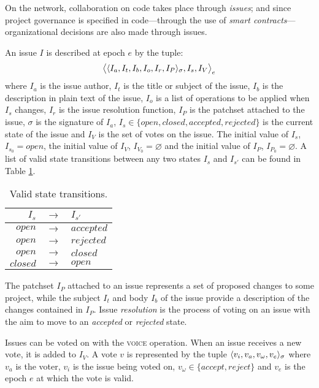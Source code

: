 On the \oscoin{} network, collaboration on code takes place through \emph{issues};
and since project governance is specified in code---through the use of
\emph{smart contracts}---organizational decisions are also made through issues.


An issue $I$ is described at epoch $e$ by the tuple:
\[
    \big<\langle I_a, I_t, I_b, I_o, I_r, I_P \rangle_{\sigma}, I_s, I_V \big>_e
\]
where $I_a$ is the issue author, $I_t$ is the title or subject of the issue,
$I_b$ is the description in plain text of the issue, $I_o$ is a list of
operations to be applied when $I_s$ changes, $I_r$ is the issue resolution
function, $I_P$ is the patchset attached to the issue, $\sigma$ is the
signature of $I_a$, $I_s \in \{open, closed, accepted, rejected\}$ is the
current state of the issue and $I_V$ is the set of votes on the issue. The
initial value of $I_s$, $I_{s_0} = open$, the initial value of $I_V$, $I_{V_0}
= \varnothing$ and the initial value of $I_P$, $I_{P_0} = \varnothing$.  A list
of valid state transitions between any two states $I_s$ and $I_{s'}$ can be
found in Table \ref{issues-valid-transitions}.

\begin{table}[hbt]
    \caption{Valid state transitions.\label{issues-valid-transitions}}
    \begin{tabular}{rcl}
        \toprule
        $I_s$      & $\to$ & $I_{s'}$ \\
        \midrule
        $open$     & $\to$ & $accepted$ \\
        $open$     & $\to$ & $rejected$ \\
        $open$     & $\to$ & $closed$ \\
        $closed$   & $\to$ & $open$ \\
        \bottomrule
    \end{tabular}
\end{table}

The patchset $I_P$ attached to an issue represents a set of proposed changes to
some project, while the subject $I_t$ and body $I_b$ of the issue provide a
description of the changes contained in $I_P$. Issue \emph{resolution} is the
process of voting on an issue with the aim to move to an \emph{accepted} or
\emph{rejected} state.

Issues can be voted on with the \textsc{voice} operation. When an issue receives
a new vote, it is added to $I_V$. A vote $v$ is represented by the tuple
$\langle v_i, v_a, v_{\omega}, v_e \rangle_{\sigma}$ where $v_a$ is the voter,
$v_i$ is the issue being voted on, $v_{\omega} \in \{accept, reject\}$ and
$v_e$ is the epoch $e$ at which the vote is valid.

